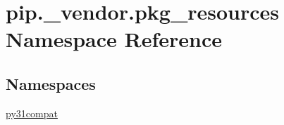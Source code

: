 \hypertarget{namespacepip_1_1__vendor_1_1pkg__resources}{}\section{pip.\+\_\+vendor.\+pkg\+\_\+resources Namespace Reference}
\label{namespacepip_1_1__vendor_1_1pkg__resources}
\subsection*{Namespaces}
\begin{DoxyCompactItemize}
\item 
 \hyperlink{namespacepip_1_1__vendor_1_1pkg__resources_1_1py31compat}{py31compat}
\end{DoxyCompactItemize}
